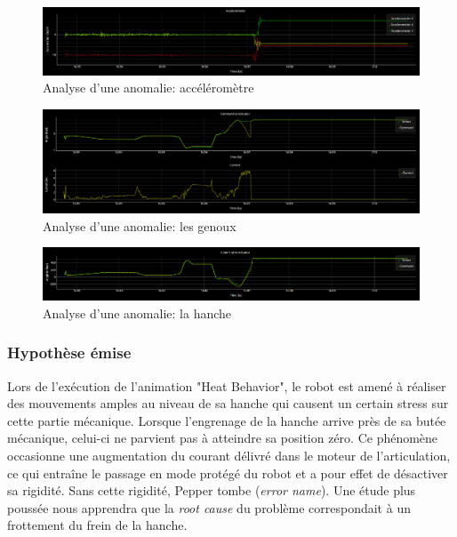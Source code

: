 \begin{figure}[h]
	\centering\includegraphics[width=15cm]{images/analyse_1.png}
	\caption{Analyse d'une anomalie: accéléromètre}
	\label{fig:analyse d'une anomalie: accéléromètre}
\end{figure}

\begin{figure}[h]
	\centering\includegraphics[width=15cm]{images/analyse_2.png}
	\caption{Analyse d'une anomalie: les genoux}
	\label{fig:analyse d'une anomalie: kneePitch}
\end{figure}

\begin{figure}[h]
	\centering\includegraphics[width=15cm]{images/analyse_3.png}
	\caption{Analyse d'une anomalie: la hanche}
	\label{fig:analyse d'une anomalie: hipitch}
\end{figure}

\subsubsection{Hypothèse émise}
 Lors de l'exécution de l'animation "Heat Behavior", le robot est amené à réaliser des mouvements amples au niveau de sa hanche qui causent un certain stress sur cette partie mécanique. Lorsque l'engrenage de la hanche arrive près de sa butée mécanique, celui-ci ne parvient pas à atteindre sa position zéro. Ce phénomène occasionne une augmentation du courant délivré dans le moteur de l'articulation, ce qui entraîne le passage en mode protégé du robot et a pour effet de désactiver sa rigidité. Sans cette rigidité, Pepper tombe (\emph{error name}). Une étude plus poussée nous apprendra que la\emph{ root cause } du problème correspondait à un frottement du frein de la hanche. 


